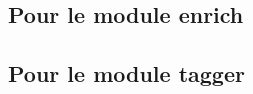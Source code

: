 \documentclass[manual-fr.tex]{subfiles}
\begin{document}
\subsection{Pour le module enrich}


\subsection{Pour le module tagger}

\end{document}
